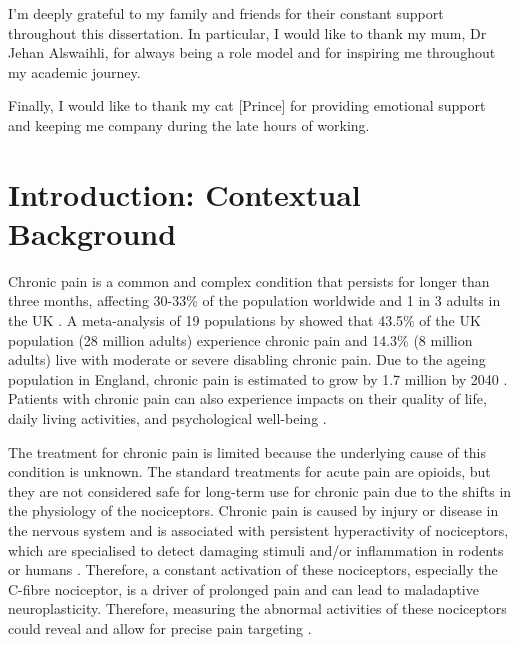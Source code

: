 \documentclass[ %
                    author={Rzan Alkabier},
                    supervisor={Dr. Zahraa Abdallah},
                    degree={MSc},
                     title={Denoising Extracellular Recording for Spike Detection and Classification on Single Channels},
                    subtitle={Does denoising improve detection and classification performance?},
                      type={},
                      year={2026}]{dissertation}
\begin{document}
\noindent
I'm deeply grateful to my family and friends for their constant support throughout this dissertation. In particular, I would like to thank my mum, Dr Jehan Alswaihli, for always being a role model and for inspiring me throughout my academic journey.

\noindent
Finally, I would like to thank my cat [Prince] for providing emotional support and keeping me company during the late hours of working. 

%

\mainmatter


\chapter{Introduction: Contextual Background}
\label{chap:introduction}
Chronic pain is a common and complex condition that persists for longer than three months, affecting 30-33\% of the population worldwide and 1 in 3 adults in the UK \cite{shetty_chronic_2025}. A meta-analysis of 19 populations by \cite{fayaz_prevalence_2016} showed that 43.5\% of the UK population (28 million adults) experience chronic pain and 14.3\% (8 million adults) live with moderate or severe disabling chronic pain. Due to the ageing population in England, chronic pain is estimated to grow by 1.7 million by 2040 \cite{toby_watt_health_2023}. Patients with chronic pain can also experience impacts on their quality of life, daily living activities, and psychological well-being \cite{andersen_psychosocial_2014}. 
\bigskip

\noindent
The treatment for chronic pain is limited because the underlying cause of this condition is unknown. The standard treatments for acute pain are opioids, but they are not considered safe for long-term use for chronic pain due to the shifts in the physiology of the nociceptors. 
Chronic pain is caused by injury or disease in the nervous system and is associated with persistent hyperactivity of nociceptors, which are specialised to detect damaging stimuli and/or inflammation in rodents or humans \cite{walters_persistent_2023}. Therefore, a constant activation of these nociceptors, especially the C-fibre nociceptor, is a driver of prolonged pain and can lead to maladaptive neuroplasticity. Therefore, measuring the abnormal activities of these nociceptors could reveal and allow for precise pain targeting \cite{ossipov_central_2010}. 
\bigskip
\end{document}
